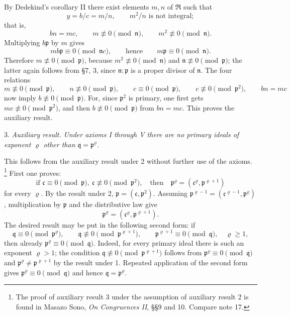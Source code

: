 \documentclass[11pt]{article}
\providecommand{\mR}{\mathfrak{R}}
\providecommand{\mc}{\mathfrak{c}}
\providecommand{\mn}{\mathfrak{n}}
\providecommand{\mpideal}{\mathfrak{p}}
\providecommand{\mq}{\mathfrak{q}}
\begin{document}
By Dedekind's corollary II there exist elements $m,n$ of $\mR$ such that
\[
        y=b/c=m/n,
        \qquad m^2/n \text{ is not integral};
\]
that is,
\[
        bn=mc,
        \qquad m\not\equiv0\pmod{\mn},
        \qquad m^2\not\equiv0\pmod{\mn}.
\]
Multiplying $b\mpideal$ by $m$ gives
\[
        mb\mpideal\equiv0\pmod{\mn c},
        \qquad\text{hence}\qquad m\mpideal\equiv0\pmod{\mn}.
\]
Therefore $m\not\equiv0\pmod{\mpideal}$, because $m^2\not\equiv0\pmod{\mn}$ and $\mn\not\equiv0\pmod{\mpideal}$; the latter again follows from §7, 3, since $\mn:\mpideal$ is a proper divisor of $\mn$. The four relations
\[
        m\not\equiv0\pmod{\mpideal},\qquad
        n\not\equiv0\pmod{\mpideal},\qquad
        c\equiv0\pmod{\mpideal},\qquad
        c\not\equiv0\pmod{\mpideal^2},\qquad
        bn=mc
\]
now imply $b\not\equiv0\pmod{\mpideal}$. For, since $\mpideal^2$ is primary, one first gets $mc\not\equiv0\pmod{\mpideal^2}$, and then $b\not\equiv0\pmod{\mpideal}$ from $bn=mc$. This proves the auxiliary result.

3. \emph{Auxiliary result.} \emph{Under axioms I through V there are no primary ideals of exponent $\varrho$ other than $\mq=\mpideal^\varrho$.}

This follows from the auxiliary result under 2 without further use of the axioms.
\footnote{The proof of auxiliary result 3 under the assumption of auxiliary result 2 is found in Masazo Sono, \emph{On Congruences II}, §§9 and 10. Compare note 17.}
First one proves:
\[
        \text{if }\mc\equiv0\pmod{\mpideal},\ \mc\not\equiv0\pmod{\mpideal^2},
        \quad\text{then}\quad
        \mpideal^\varrho=(\mc^\varrho,\mpideal^{\varrho+1})
\]
for every $\varrho$. By the result under 2, $\mpideal=(\mc,\mpideal^2)$. Assuming $\mpideal^{\varrho-1}=(\mc^{\varrho-1},\mpideal^\varrho)$, multiplication by $\mpideal$ and the distributive law give
\[
        \mpideal^\varrho=(\mc^\varrho,\mpideal^{\varrho+1}).
\]
The desired result may be put in the following second form: if
\[
        \mq\equiv0\pmod{\mpideal^\varrho},
        \qquad \mq\not\equiv0\pmod{\mpideal^{\varrho+1}},
        \qquad \mpideal^{\varrho+1}\equiv0\pmod{\mq},
        \quad \varrho\ge1,
\]
then already $\mpideal^\varrho\equiv0\pmod{\mq}$. Indeed, for every primary ideal there is such an exponent $\varrho>1$; the condition $\mq\not\equiv0\pmod{\mpideal^{\varrho+1}}$ follows from $\mpideal^\varrho\equiv0\pmod{\mq}$ and $\mpideal^\varrho\ne\mpideal^{\varrho+1}$ by the result under 1. Repeated application of the second form gives $\mpideal^\varrho\equiv0\pmod{\mq}$ and hence $\mq=\mpideal^\varrho$.
\end{document}
